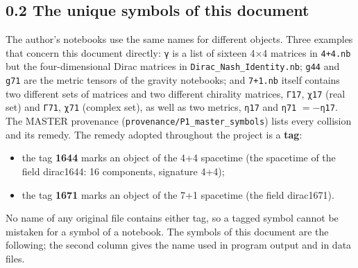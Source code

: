 \documentclass[
  10pt,
]{article}
\providecommand{\tightlist}{%
  \setlength{\itemsep}{0pt}\setlength{\parskip}{0pt}}
\begin{document}
\hypertarget{the-unique-symbols-of-this-document}{%
\subsection{0.2 The unique symbols of this
document}\label{the-unique-symbols-of-this-document}}

The author's notebooks use the same names for different objects. Three
examples that concern this document directly: \texttt{γ} is a list of
sixteen 4×4 matrices in \texttt{4+4.nb} but the four-dimensional Dirac
matrices in \texttt{Dirac\_Nash\_Identity.nb}; \texttt{g44} and
\texttt{g71} are the metric tensors of the gravity notebooks; and
\texttt{7+1.nb} itself contains two different sets of matrices and two
different chirality matrices, \texttt{Γ17}, \texttt{χ17} (real set) and
\texttt{Γ71}, \texttt{χ71} (complex set), as well as two metrics,
\texttt{η17} and \texttt{η71} \(=-\)\texttt{η17}. The MASTER provenance
(\texttt{provenance/P1\_master\_symbols}) lists every collision and its
remedy. The remedy adopted throughout the project is a \textbf{tag}:

\begin{itemize}
\tightlist
\item
  the tag \textbf{1644} marks an object of the 4+4 spacetime (the
  spacetime of the field dirac1644: 16 components, signature 4+4);
\item
  the tag \textbf{1671} marks an object of the 7+1 spacetime (the field
  dirac1671).
\end{itemize}

No name of any original file contains either tag, so a tagged symbol
cannot be mistaken for a symbol of a notebook. The symbols of this
document are the following; the second column gives the name used in
program output and in data files.
\end{document}
